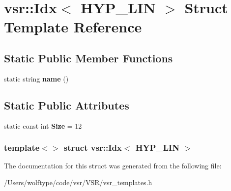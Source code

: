 \hypertarget{structvsr_1_1_idx_3_01_h_y_p___l_i_n_01_4}{\section{vsr\-:\-:Idx$<$ H\-Y\-P\-\_\-\-L\-I\-N $>$ Struct Template Reference}
\label{structvsr_1_1_idx_3_01_h_y_p___l_i_n_01_4}
}
\subsection*{Static Public Member Functions}
\begin{DoxyCompactItemize}
\item 
\hypertarget{structvsr_1_1_idx_3_01_h_y_p___l_i_n_01_4_ab4449fb2fe740e1b774a78d7456443d2}{static string {\bfseries name} ()}\label{structvsr_1_1_idx_3_01_h_y_p___l_i_n_01_4_ab4449fb2fe740e1b774a78d7456443d2}

\end{DoxyCompactItemize}
\subsection*{Static Public Attributes}
\begin{DoxyCompactItemize}
\item 
\hypertarget{structvsr_1_1_idx_3_01_h_y_p___l_i_n_01_4_a60874f62a7fe2a2cc861ed58573de1c6}{static const int {\bfseries Size} = 12}\label{structvsr_1_1_idx_3_01_h_y_p___l_i_n_01_4_a60874f62a7fe2a2cc861ed58573de1c6}

\end{DoxyCompactItemize}
\subsubsection*{template$<$$>$ struct vsr\-::\-Idx$<$ H\-Y\-P\-\_\-\-L\-I\-N $>$}



The documentation for this struct was generated from the following file\-:\begin{DoxyCompactItemize}
\item 
/\-Users/wolftype/code/vsr/\-V\-S\-R/vsr\-\_\-templates.\-h\end{DoxyCompactItemize}
